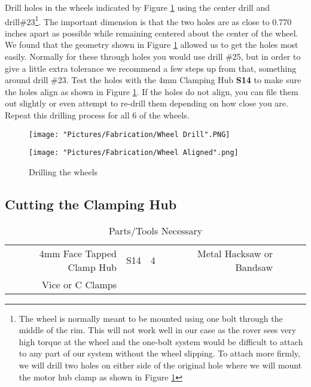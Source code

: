 \documentclass[12pt]{article}
\begin{document}
Drill holes in the wheels indicated by Figure \ref{Wheel drill} using the center drill and drill\#23\footnote{The wheel is normally meant to be mounted using one bolt through the middle of the rim. This will not work well in our case as the rover sees very high torque at the wheel and the one-bolt system would be difficult to attach to any part of our system without the wheel slipping. To attach more firmly, we will drill two holes on either side of the original hole where we will mount the motor hub clamp as shown in Figure \ref{Wheel drill}}. The important dimension is that the two holes are as close to 0.770 inches apart as possible while remaining centered about the center of the wheel. We found that the geometry shown in Figure \ref{Wheel drill} allowed us to get the holes most easily. Normally for these through holes you would use drill \#25, but in order to give a little extra tolerance we recommend a few steps up from that, something around drill \#23. Test the holes with the 4mm Clamping Hub \textbf{S14} to make sure the holes align as shown in Figure \ref{Wheel drill}. If the holes do not align, you can file them out slightly or even attempt to re-drill them depending on how close you are. Repeat this drilling process for all 6 of the wheels.


\begin{figure}[H]
  \centering
  \begin{minipage}[b]{0.45\textwidth}
    \texttt{[image: "Pictures/Fabrication/Wheel Drill".PNG]}
  \end{minipage}
  \hfill
  \begin{minipage}[b]{0.45\textwidth}
    \texttt{[image: "Pictures/Fabrication/Wheel Aligned".png]}
  \end{minipage}
  \caption{Drilling the wheels}
  \label{Wheel drill}
\end{figure}


\subsection{Cutting the Clamping Hub}

\begin{table}[H]
    \centering
    \sffamily\footnotesize
    \caption{Parts/Tools Necessary}
    \begin{tabular}{|N|Q|Q|I|N|Q|Q|I|}
        \hline
         &  &  &  &  &  &  &  \\
        \hline
        4mm Face Tapped Clamp Hub & S14 & 4 &  & Metal Hacksaw or Bandsaw & & & \\ \hline
        Vice or C Clamps & & & & & & & \\ \hline
    \end{tabular}
\end{table}
\end{document}
